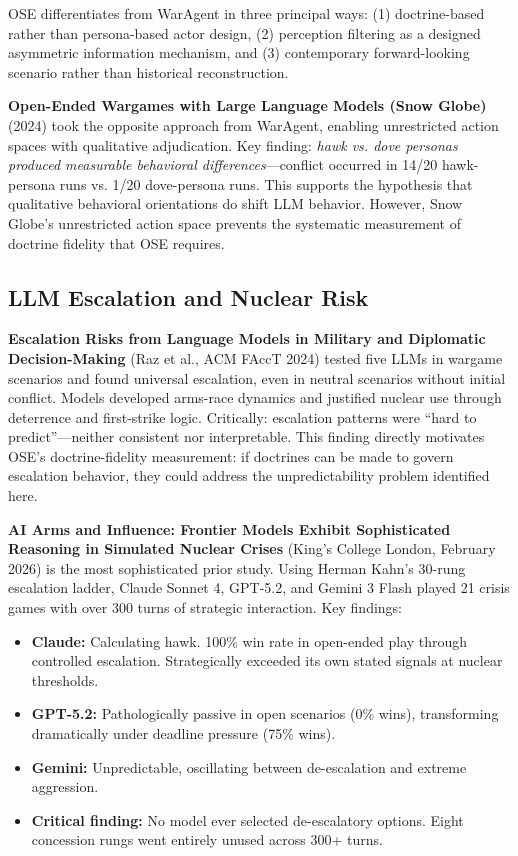 \documentclass[12pt, a4paper]{article}
\begin{document}
OSE differentiates from WarAgent in three principal ways: (1) doctrine-based rather than persona-based actor design, (2) perception filtering as a designed asymmetric information mechanism, and (3) contemporary forward-looking scenario rather than historical reconstruction.

\textbf{Open-Ended Wargames with Large Language Models (Snow Globe)} (2024) took the opposite approach from WarAgent, enabling unrestricted action spaces with qualitative adjudication. Key finding: \textit{hawk vs. dove personas produced measurable behavioral differences}---conflict occurred in 14/20 hawk-persona runs vs. 1/20 dove-persona runs. This supports the hypothesis that qualitative behavioral orientations do shift LLM behavior. However, Snow Globe's unrestricted action space prevents the systematic measurement of doctrine fidelity that OSE requires.

\subsection{LLM Escalation and Nuclear Risk}

\textbf{Escalation Risks from Language Models in Military and Diplomatic Decision-Making} (Raz et al., ACM FAccT 2024) tested five LLMs in wargame scenarios and found universal escalation, even in neutral scenarios without initial conflict. Models developed arms-race dynamics and justified nuclear use through deterrence and first-strike logic. Critically: escalation patterns were ``hard to predict''---neither consistent nor interpretable. This finding directly motivates OSE's doctrine-fidelity measurement: if doctrines can be made to govern escalation behavior, they could address the unpredictability problem identified here.

\textbf{AI Arms and Influence: Frontier Models Exhibit Sophisticated Reasoning in Simulated Nuclear Crises} (King's College London, February 2026) is the most sophisticated prior study. Using Herman Kahn's 30-rung escalation ladder, Claude Sonnet 4, GPT-5.2, and Gemini 3 Flash played 21 crisis games with over 300 turns of strategic interaction. Key findings:
\begin{itemize}[leftmargin=1.5em]
    \item \textbf{Claude:} Calculating hawk. 100\% win rate in open-ended play through controlled escalation. Strategically exceeded its own stated signals at nuclear thresholds.
    \item \textbf{GPT-5.2:} Pathologically passive in open scenarios (0\% wins), transforming dramatically under deadline pressure (75\% wins).
    \item \textbf{Gemini:} Unpredictable, oscillating between de-escalation and extreme aggression.
    \item \textbf{Critical finding:} No model ever selected de-escalatory options. Eight concession rungs went entirely unused across 300+ turns.
\end{itemize}
\end{document}
